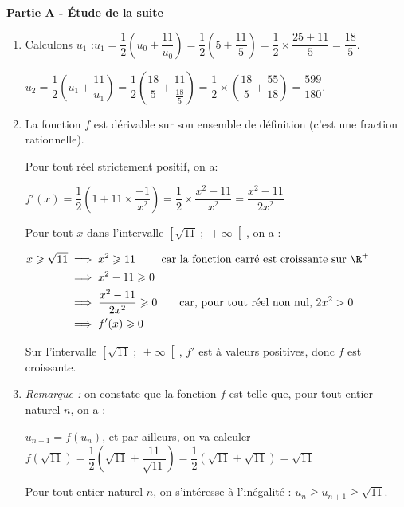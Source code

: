 \medskip

\textbf{Partie A - Étude de la suite }

\medskip

\begin{enumerate}
\item Calculons $u_{1}$ :\quad $u_1 = \dfrac{1}{2}\left(u_0 + \dfrac{11}{u_0}\right) = \dfrac{1}{2}\left(5 + \dfrac{11}{5}\right) = \dfrac{1}{2}\times \dfrac{25 + 11}{5} = \dfrac{18}{5}$.

 $u_2 = \dfrac{1}{2}\left(u_1 + \dfrac{11}{u_1}\right) = \dfrac{1}{2}\left(\dfrac{18}{5} + \dfrac{11}{\frac{18}{5}}\right) = \dfrac{1}{2}\times \left(\dfrac{18}{5}+\dfrac{55}{18}\right)  = \dfrac{599}{180}$.

\item La fonction $f$ est dérivable sur son ensemble de définition (c'est une fraction rationnelle).

Pour tout réel strictement positif, on a:

$f'(x) = \dfrac{1}{2}\left(1 + 11\times \dfrac{-1}{x^2}\right) = \dfrac{1}{2}\times \dfrac{x^2 - 11}{x^2} = \dfrac{x^2-11}{2x^2}$

Pour tout $x$ dans l'intervalle $\left[\sqrt{11} ~;~+\infty\right[$, on a :

$\begin{aligned} x \geqslant \sqrt{11} &\implies x^2 \geqslant 11 \qquad\text{ car la fonction carré est croissante sur }\R^+\\
&\implies x^2 - 11 \geqslant 0\\
&\implies \dfrac{x^2-11}{2x^2} \geqslant 0 \qquad \text{car, pour tout réel non nul, } 2x^2>0 \\
&\implies f'(x) \geqslant 0\\ \end{aligned}$

Sur l'intervalle $\left[\sqrt{11} ~;~+\infty\right[$, $f'$ est à valeurs positives, donc $f$ est croissante.

\item \emph{Remarque :} on constate que la fonction $f$ est telle que, pour tout entier naturel $n$, on a :

$u_{n+1} = f(u_n)$, et par ailleurs, on va calculer $f\left(\sqrt{11}\right) = \dfrac{1}{2}\left(\sqrt{11} + \dfrac{11}{\sqrt{11}}\right)  = \dfrac{1}{2}\left(\sqrt{11} + \sqrt{11}\right) = \sqrt{11}$

Pour tout entier naturel $n$, on s'intéresse à l'inégalité : $ u_{n} \geqslant u_{n+1} \geqslant \sqrt{11}$.


\end{enumerate}
